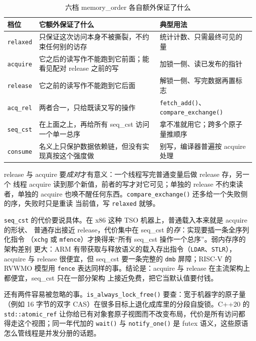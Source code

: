 \documentclass[12pt,a4paper,fontset=fandol]{ctexbook}
\newcommand{\cpp}[1]{C++#1}
\newcommand{\Fn}[1]{\texttt{#1()}}
\newcommand{\Tp}[1]{\texttt{#1}}
\newcommand{\Bk}{\allowbreak}
\begin{document}
\begin{table}[htbp]\centering
\caption{六档 memory\_order 各自额外保证了什么}
\begin{tabular}{@{}>{\raggedright\arraybackslash}p{}
  >{\raggedright\arraybackslash}p{}
  >{\raggedright\arraybackslash}p{}@{}}
\toprule
档位 & 它额外保证了什么 & 典型用法 \\
\midrule
\Tp{relaxed} & 只保证这次访问本身不被撕裂，不约束任何别的访存 & 统计计数、只需最终可见的量 \\
\Tp{acquire} & 它之后的读写作不能跑到它前面；能看见配对 release 之前的写 & 加锁一侧、读已发布的指针 \\
\Tp{release} & 它之前的读写作不能跑到它后面 & 解锁一侧、写完数据再置标志 \\
\Tp{acq\Bk\_rel} & 两者合一，只给既读又写的操作 & \Fn{fetch\_add}、\Fn{compare\_exchange} \\
\Tp{seq\_cst} & 在上面之上，再给所有 seq\_cst 访问一个单一总序 & 拿不准就用它；跨多个原子量推顺序 \\
\Tp{consume} & 名义上只保护数据依赖链，但没有实现真按这个强度做 & 别写，编译器普遍按 acquire 处理 \\
\bottomrule
\end{tabular}
\end{table}

release 与 acquire 要\emph{成对}才有意义：一个线程写完普通变量后做 release 存，另一个
线程 acquire 读到那个新值，前者的写才对它可见；单独的 release 不约束读者，单独的
acquire 也唤不醒任何东西。\Fn{compare\_exchange} 还多给一个失败侧的序，失败时只是重读
当前值，写 \Tp{relaxed} 就够。

\Tp{seq\_cst} 的代价要说具体。在 x86 这种 TSO 机器上，普通载入本来就是 acquire 的形状、
普通存出接近 release，代价集中在 seq\_cst 的\emph{存}：实现要插一条全序列化指令
（\Tp{xchg} 或 \Tp{mfence}）才换得来``所有 seq\_cst 操作一个总序''。弱内存序的架构差别
更大：ARM 有带获取与释放语义的载入存出指令（\Tp{LDAR}、\Tp{STLR}），acquire 与 release
很便宜，但 seq\_cst 要一条完整的 \Tp{dmb} 屏障；RISC-V 的 RVWMO 模型用 \Tp{fence}
表达同样的事。结论是：acquire 与 release 在主流架构上都便宜，seq\_cst 只在一部分架构
上接近免费，把它当默认值要付钱。

还有两件容易被忽略的事。\Fn{is\_{\Bk}always\_{\Bk}lock\_{\Bk}free} 要查：宽于机器字的原子量（例如 16
字节的双字 CAS）在很多目标上退化成库里的分段自旋锁。\cpp{20} 的 \Tp{std::atomic\_{\Bk}ref}
让你给已有对象套原子视图而不改变布局，代价是所有访问都得走这个视图；同一年代加的
\Fn{wait} 与 \Fn{notify\_one} 是 futex 语义，这些原语怎么管线程是并发分册的话题。
\end{document}
